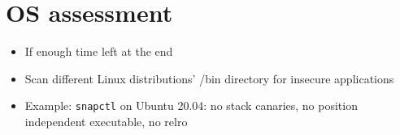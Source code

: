 \chapter{OS assessment}
\label{chp:os-assessment}


\begin{itemize}
	\item{If enough time left at the end}
	\item{Scan different Linux distributions' /bin directory for insecure applications}
	\item{Example: \texttt{snapctl} on Ubuntu 20.04: no stack canaries, no position independent executable, no \gls{relro}}
\end{itemize}
